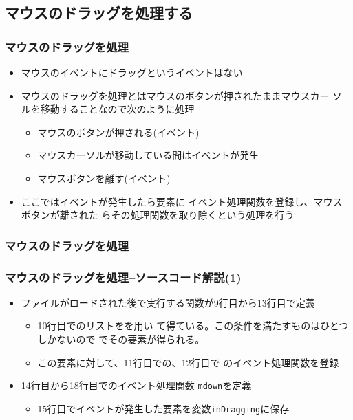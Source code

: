 \begin{frame}[containsverbatim]
\section{マウスのドラッグを処理する}
\begin{frame}[containsverbatim]
 \frametitle{マウスのドラッグを処理}
\begin{itemize}
 \item マウスのイベントにドラッグというイベントはない
 \item マウスのドラッグを処理とはマウスのボタンが押されたままマウスカー
       ソルを移動することなので次のように処理
\begin{itemize}
 \item マウスのボタンが押される(イベント)
 \item マウスカーソルが移動している間はイベントが発生
 \item マウスボタンを離す(イベント)
\end{itemize}
 \item ここではイベントが発生したら要素に
       イベント処理関数を登録し、マウスボタンが離された
       らその処理関数を取り除くという処理を行う
\end{itemize}
\end{frame}
\begin{frame}[containsverbatim]
 \frametitle{マウスのドラッグを処理}
\end{frame}
\begin{frame}[containsverbatim]
 \frametitle{マウスのドラッグを処理--ソースコード解説(1)}
\begin{itemize}
 \item ファイルがロードされた後で実行する関数が9行目から13行目で定義
   \begin{itemize}
    \item 10行目でのリストをを用い
          て得ている。この条件を満たすものはひとつしかないので
          \JSKey{[0]}でその要素が得られる。
    \item この要素に対して、11行目での、12行目で
          のイベント処理関数を登録
   \end{itemize}
 \item 14行目から18行目でのイベント処理関数
       \texttt{mdown}を定義
  \begin{itemize}
   \item 15行目でイベントが発生した要素を変数\texttt{inDragging}に保存

\end{itemize}
\end{itemize}
\end{frame}
\end{frame}
